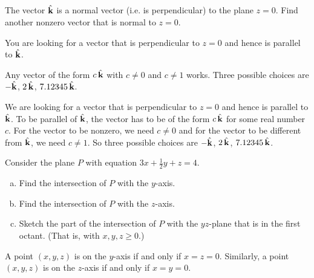 


\subsection*{\Conceptual}

\begin{question}
The vector $\hat{\mathbf{k}}$ is a normal vector (i.e. is perpendicular) to the plane $z=0$. 
Find another nonzero vector that is normal to $z=0$.
\end{question}

\begin{hint}
You are looking for a vector that is perpendicular to $z=0$ and hence is
parallel to $\hat{\mathbf{k}}$. 
\end{hint}

\begin{answer}
Any vector of the form $c\,\hat{\mathbf{k}}$ with $c\ne 0$ and $c\ne 1$ works.
Three possible choices are $-\hat{\mathbf{k}}$, $2\,\hat{\mathbf{k}}$, $7.12345\,\hat{\mathbf{k}}$.
\end{answer}

\begin{solution}
We are looking for a vector that is perpendicular to $z=0$ and hence is
parallel to $\hat{\mathbf{k}}$. To be parallel of $\hat{\mathbf{k}}$, the vector has to be of the form $c\,\hat{\mathbf{k}}$ for some real number $c$.  For the vector to be nonzero, we need $c\ne 0$ and for the vector to be different from $\hat{\mathbf{k}}$, we need $c\ne 1$. So
three possible choices are $-\hat{\mathbf{k}}$, $2\,\hat{\mathbf{k}}$, $7.12345\,\hat{\mathbf{k}}$.
\end{solution}


\begin{question}
Consider the plane $P$ with equation $3x+\frac{1}{2}y+z=4$.
\begin{enumerate}[(a)]
\item
Find the intersection of $P$ with the $y$-axis.
\item
Find the intersection of $P$ with the $z$-axis.
\item
Sketch the part of the intersection of $P$ with the $yz$-plane that is
in the first octant. (That is, with $x,y,z\ge 0$.)
\end{enumerate}
\end{question}

\begin{hint}
A point $(x,y,z)$ is on the $y$-axis if and only if $x=z=0$. Similarly,
a point $(x,y,z)$ is on the $z$-axis if and only if $x=y=0$.
\end{hint}

